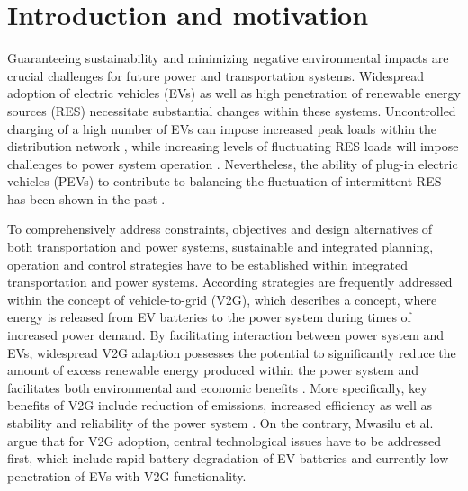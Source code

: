 \section{Introduction and motivation}

Guaranteeing sustainability and minimizing negative environmental impacts are crucial challenges for future power and transportation systems. Widespread adoption of electric vehicles (EVs) as well as high penetration of renewable energy sources (RES) necessitate substantial changes within these systems. 
Uncontrolled charging of a high number of EVs can impose increased peak loads within the distribution network \cite{lopes2009identifying}, while increasing levels of fluctuating RES loads will impose challenges to power system operation \cite{heussen2012unified}. 
Nevertheless, the ability of plug-in electric vehicles (PEVs) to contribute to balancing the fluctuation of intermittent RES has been shown in the past \cite{dallinger2012grid}. 


To comprehensively address constraints, objectives and design alternatives of both transportation and power systems, sustainable and integrated planning, operation and control strategies have to be established within integrated transportation and power systems. According strategies are frequently addressed within the concept of vehicle-to-grid (V2G), which describes a concept, where energy is released from EV batteries to the power system during times of increased power demand. By facilitating interaction between power system and EVs, widespread V2G adaption possesses the potential to significantly reduce the amount of excess renewable energy produced within the power system and facilitates both environmental and economic benefits \cite{richardson2013electric, faria2012sustainability, mwasilu2014electric}. More specifically, key benefits of V2G include reduction of emissions, increased efficiency as well as stability and reliability of the power system \cite{yilmaz2013review}.
On the contrary, Mwasilu et al.~\cite{mwasilu2014electric} argue that for V2G adoption, central technological issues 
have to be addressed first, which include rapid battery degradation of EV batteries and currently low penetration of EVs with V2G functionality.


